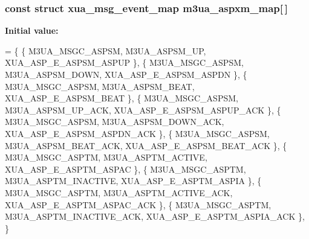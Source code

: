 \subsubsection[{m3ua\+\_\+aspxm\+\_\+map}]{\setlength{\rightskip}{0pt plus 5cm}const struct {\bf xua\+\_\+msg\+\_\+event\+\_\+map} m3ua\+\_\+aspxm\+\_\+map[$\,$]\hspace{0.3cm}{\ttfamily [static]}}\label{m3ua_8c_a95c8d714f16e4cad5cd2291946f2d018}
{\bfseries Initial value\+:}
\begin{DoxyCode}
= \{
        \{ M3UA_MSGC_ASPSM, M3UA_ASPSM_UP, XUA_ASP_E_ASPSM_ASPUP \},
        \{ M3UA_MSGC_ASPSM, M3UA_ASPSM_DOWN, XUA_ASP_E_ASPSM_ASPDN \},
        \{ M3UA_MSGC_ASPSM, M3UA_ASPSM_BEAT, XUA_ASP_E_ASPSM_BEAT \},
        \{ M3UA_MSGC_ASPSM, M3UA_ASPSM_UP_ACK, XUA_ASP_E_ASPSM_ASPUP_ACK \},
        \{ M3UA_MSGC_ASPSM, M3UA_ASPSM_DOWN_ACK, XUA_ASP_E_ASPSM_ASPDN_ACK \},
        \{ M3UA_MSGC_ASPSM, M3UA_ASPSM_BEAT_ACK, XUA_ASP_E_ASPSM_BEAT_ACK \},
        \{ M3UA_MSGC_ASPTM, M3UA_ASPTM_ACTIVE, XUA_ASP_E_ASPTM_ASPAC \},
        \{ M3UA_MSGC_ASPTM, M3UA_ASPTM_INACTIVE, XUA_ASP_E_ASPTM_ASPIA \},
        \{ M3UA_MSGC_ASPTM, M3UA_ASPTM_ACTIVE_ACK, XUA_ASP_E_ASPTM_ASPAC_ACK \},
        \{ M3UA_MSGC_ASPTM, M3UA_ASPTM_INACTIVE_ACK, XUA_ASP_E_ASPTM_ASPIA_ACK \},
\}
\end{DoxyCode}
